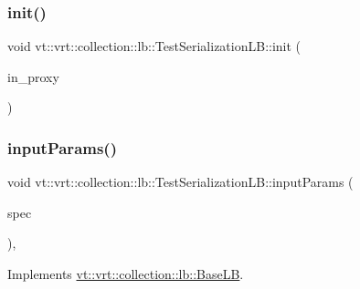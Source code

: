 \subsubsection{\texorpdfstring{init()}{init()}}
{\footnotesize\ttfamily void vt\+::vrt\+::collection\+::lb\+::\+Test\+Serialization\+L\+B\+::init (\begin{DoxyParamCaption}\item[{\hyperlink{structvt_1_1objgroup_1_1proxy_1_1_proxy}{objgroup\+::proxy\+::\+Proxy}$<$ \hyperlink{structvt_1_1vrt_1_1collection_1_1lb_1_1_test_serialization_l_b}{Test\+Serialization\+LB} $>$}]{in\+\_\+proxy }\end{DoxyParamCaption})}

\mbox{\label{structvt_1_1vrt_1_1collection_1_1lb_1_1_test_serialization_l_b_ab47faba8dbbed428c3f00597fcf9235c}} 
\subsubsection{\texorpdfstring{input\+Params()}{inputParams()}}
{\footnotesize\ttfamily void vt\+::vrt\+::collection\+::lb\+::\+Test\+Serialization\+L\+B\+::input\+Params (\begin{DoxyParamCaption}\item[{\hyperlink{structvt_1_1vrt_1_1collection_1_1balance_1_1_spec_entry}{balance\+::\+Spec\+Entry} $\ast$}]{spec }\end{DoxyParamCaption})\hspace{0.3cm}{\ttfamily [override]}, {\ttfamily [virtual]}}



Implements \hyperlink{structvt_1_1vrt_1_1collection_1_1lb_1_1_base_l_b_a555e29aadfd428383464d6dd007506b6}{vt\+::vrt\+::collection\+::lb\+::\+Base\+LB}.

\mbox{\label{structvt_1_1vrt_1_1collection_1_1lb_1_1_test_serialization_l_b_a47b93135928a6f1635d7c71995d4ed11}} 
